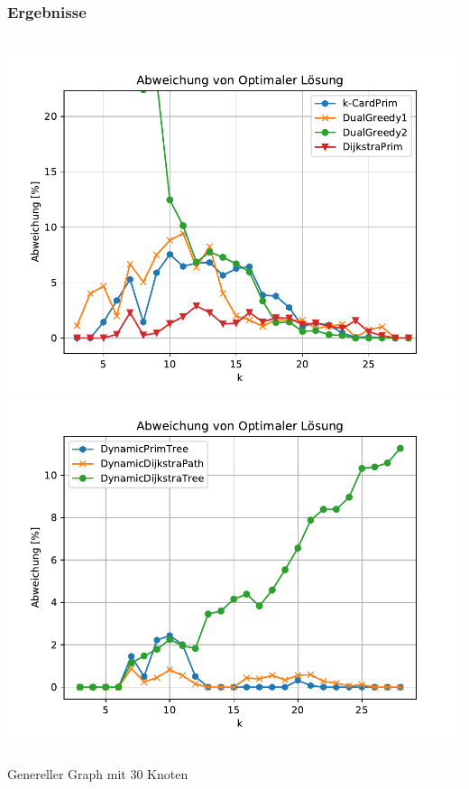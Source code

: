 \documentclass[aspectratio=169]{beamer}
\begin{document}
\begin{frame}
	\frametitle{Ergebnisse}
	
	\begin{columns}[c] %
		
		\includegraphics[scale=.45]{plot_greedy-path.pdf}
		\includegraphics[scale=.45]{plot_dynamic.pdf}
		
		
	\end{columns}
	\centering
	Genereller Graph mit 30 Knoten
	\end{frame}
	
\end{document}
